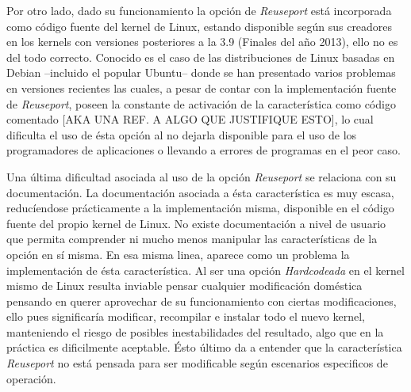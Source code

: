 Por otro lado, dado su funcionamiento la opción de \emph{Reuseport} está incorporada como código fuente del kernel de Linux, estando disponible según sus creadores en los kernels con versiones posteriores a la 3.9 (Finales del año 2013), ello no es del todo correcto. Conocido es el caso de las distribuciones de Linux basadas en Debian --incluido el popular Ubuntu-- donde se han presentado varios problemas en versiones recientes las cuales, a pesar de contar con la implementación fuente de \emph{Reuseport}, poseen la constante de activación de la característica como código comentado [AKA UNA REF. A ALGO QUE JUSTIFIQUE ESTO], lo cual dificulta el uso de ésta opción al no dejarla disponible para el uso de los programadores de aplicaciones o llevando a errores de programas en el peor caso.

Una última dificultad asociada al uso de la opción \emph{Reuseport} se relaciona con su documentación. La documentación asociada a ésta característica es muy escasa, reducíendose prácticamente a la implementación misma, disponible en el código fuente del propio kernel de Linux. No existe documentación a nivel de usuario que permita comprender ni mucho menos manipular las características de la opción en sí misma. En esa misma linea, aparece como un problema la implementación de ésta característica. Al ser una opción \emph{Hardcodeada} en el kernel mismo de Linux resulta inviable pensar cualquier modificación doméstica pensando en querer aprovechar de su funcionamiento con ciertas modificaciones, ello pues significaría modificar, recompilar e instalar todo el nuevo kernel, manteniendo el riesgo de posibles inestabilidades del resultado, algo que en la práctica es dificilmente aceptable. Ésto último da a entender que la característica \emph{Reuseport} no está pensada para ser modificable según escenarios especificos de operación.